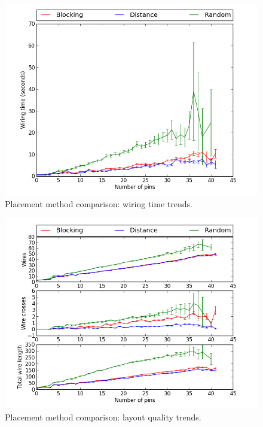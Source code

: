 \begin{figure}[H]
\begin{center}
\includegraphics[width=\textwidth]{Images/placement_time_trend_comparison.png}
\caption{Placement method comparison: wiring time trends.}
\label{fig:placement_time_trend}
\end{center}
\end{figure}

\begin{figure}
\begin{center}
\includegraphics[width=\textwidth]{Images/placement_quality_trend_comparison.png}
\caption{Placement method comparison: layout quality trends.}
\label{fig:placement_quality_trend}
\end{center}
\end{figure}

